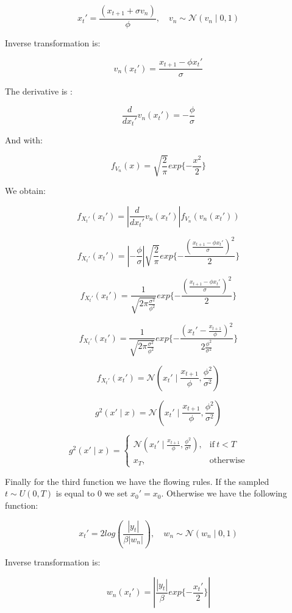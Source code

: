 \documentclass[]{article}
\begin{document}
$$ x_t' =  \frac{( x_{t+1} + \sigma v_n)}{\phi}  , \quad v_n \sim \mathcal{N}(v_n \mid 0,1) $$

Inverse transformation is:

$$ v_n(x_t') = \frac{x_{t+1} - \phi x_t'}{\sigma}  $$

The derivative is :

$$ \frac{d}{d x_t'} v_n(x_t') = -\frac{\phi}{\sigma} $$

And with:

$$  f_{V_n}( x ) = \sqrt{\frac{2}{\pi}} exp\{ -\frac{x^2}{2} \} $$

We obtain:

$$ f_{X_t'}(x_t') = \left | \frac{d}{dx_t'} v_n(x_t') \right | f_{V_n}(v_n(x_t')) $$

$$ f_{X_t'}(x_t') = \left | -\frac{\phi}{\sigma} \right | \sqrt{\frac{2}{\pi}} exp\{ -\frac{ (\frac{x_{t+1} - \phi x_t'}{\sigma})^2}{2} \}$$

$$ f_{X_t'}(x_t') =  \frac{1}{ \sqrt{2 \pi \frac{\sigma^2}{\phi^2} }} exp\{ -\frac{ (\frac{x_{t+1} - \phi x_t'}{\sigma})^2}{2} \}$$

$$ f_{X_t'}(x_t') =  \frac{1}{ \sqrt{2 \pi \frac{\sigma^2}{\phi^2} }} exp\{ -\frac{ ( x_t' - \frac{x_{t+1}}{\phi} )^2}{2 \frac{\phi^2}{\sigma^2}} \}$$

$$ f_{X_t'}(x_t') = \mathcal{N}(x_t' \mid \frac{x_{t+1}}{\phi}, \frac{\phi^2}{\sigma^2}) $$


$$ g^2(x' \mid x) = \mathcal{N}(x_t' \mid \frac{x_{t+1}}{\phi}, \frac{\phi^2}{\sigma^2}) $$



\begin{equation}
g^2(x' \mid x)=
\begin{cases}
\mathcal{N}(x_t' \mid \frac{x_{t+1}}{\phi}, \frac{\phi^2}{\sigma^2}), & \text{if}\ t<T \\
x_T , & \text{otherwise}
\end{cases}
\end{equation}

Finally for the third function we have the flowing rules. If the sampled $t \sim U(0,T)$ is equal to $0$ we set $x_0' = x_0$. Otherwise we have the following function:

$$ x_t' =  2 log(\frac{|y_t|}{\beta |w_n|})  , \quad w_n \sim \mathcal{N}(w_n \mid 0,1) $$

Inverse transformation is:

$$ w_n(x_t') = \left| \frac{|y_t|}{\beta} exp \{ - \frac{x_t'}{2}\} \right | $$
\end{document}
